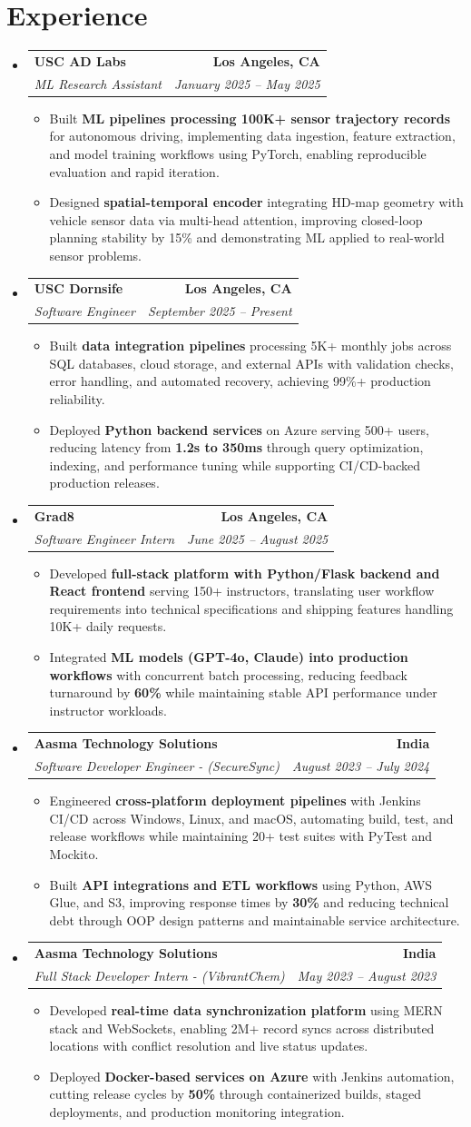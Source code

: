 \documentclass[letterpaper,10pt]{article}
\makeatletter
\newcommand{\resumeItem}[1]{\item\small{{#1 \vspace{-2pt}}}}
\newcommand{\resumeSubheading}[4]{\vspace{-1pt}\item\begin{tabular*}{1.0\textwidth}[t]{l@{\extracolsep{\fill}}r}\textbf{#1} & \textbf{\small #2} \\\textit{\small#3} & \textit{\small #4} \\\end{tabular*}\vspace{-2pt}}
\newcommand{\resumeSubHeadingListStart}{\begin{itemize}[leftmargin=0.0in, label={}]}
\newcommand{\resumeSubHeadingListEnd}{\end{itemize}}
\newcommand{\resumeItemListStart}{\begin{itemize}[leftmargin=0.15in,label=\textbullet,itemsep=2pt,topsep=0pt,parsep=0pt,partopsep=0pt]}
\newcommand{\resumeItemListEnd}{\end{itemize}\vspace{-4pt}}
\makeatother
\begin{document}
\section{Experience}
\resumeSubHeadingListStart
\resumeSubheading{USC AD Labs}{Los Angeles, CA}{ML Research Assistant}{January 2025 -- May 2025}
\resumeItemListStart
\resumeItem{Built \textbf{ML pipelines processing 100K+ sensor trajectory records} for autonomous driving, implementing data ingestion, feature extraction, and model training workflows using PyTorch, enabling reproducible evaluation and rapid iteration.}
\resumeItem{Designed \textbf{spatial-temporal encoder} integrating HD-map geometry with vehicle sensor data via multi-head attention, improving closed-loop planning stability by 15\% and demonstrating ML applied to real-world sensor problems.}
\resumeItemListEnd
\resumeSubheading{USC Dornsife}{Los Angeles, CA}{Software Engineer}{September 2025 -- Present}
\resumeItemListStart
\resumeItem{Built \textbf{data integration pipelines} processing 5K+ monthly jobs across SQL databases, cloud storage, and external APIs with validation checks, error handling, and automated recovery, achieving 99\%+ production reliability.}
\resumeItem{Deployed \textbf{Python backend services} on Azure serving 500+ users, reducing latency from \textbf{1.2s to 350ms} through query optimization, indexing, and performance tuning while supporting CI/CD-backed production releases.}
\resumeItemListEnd
\resumeSubheading{Grad8}{Los Angeles, CA}{Software Engineer Intern}{June 2025 -- August 2025}
\resumeItemListStart
\resumeItem{Developed \textbf{full-stack platform with Python/Flask backend and React frontend} serving 150+ instructors, translating user workflow requirements into technical specifications and shipping features handling 10K+ daily requests.}
\resumeItem{Integrated \textbf{ML models (GPT-4o, Claude) into production workflows} with concurrent batch processing, reducing feedback turnaround by \textbf{60\%} while maintaining stable API performance under instructor workloads.}
\resumeItemListEnd
\resumeSubheading{Aasma Technology Solutions}{India}{Software Developer Engineer - (SecureSync)}{August 2023 -- July 2024}
\resumeItemListStart
\resumeItem{Engineered \textbf{cross-platform deployment pipelines} with Jenkins CI/CD across Windows, Linux, and macOS, automating build, test, and release workflows while maintaining 20+ test suites with PyTest and Mockito.}
\resumeItem{Built \textbf{API integrations and ETL workflows} using Python, AWS Glue, and S3, improving response times by \textbf{30\%} and reducing technical debt through OOP design patterns and maintainable service architecture.}
\resumeItemListEnd
\resumeSubheading{Aasma Technology Solutions}{India}{Full Stack Developer Intern - (VibrantChem)}{May 2023 -- August 2023}
\resumeItemListStart
\resumeItem{Developed \textbf{real-time data synchronization platform} using MERN stack and WebSockets, enabling 2M+ record syncs across distributed locations with conflict resolution and live status updates.}
\resumeItem{Deployed \textbf{Docker-based services on Azure} with Jenkins automation, cutting release cycles by \textbf{50\%} through containerized builds, staged deployments, and production monitoring integration.}
\resumeItemListEnd
\resumeSubHeadingListEnd
\vspace{-14pt}
\end{document}
